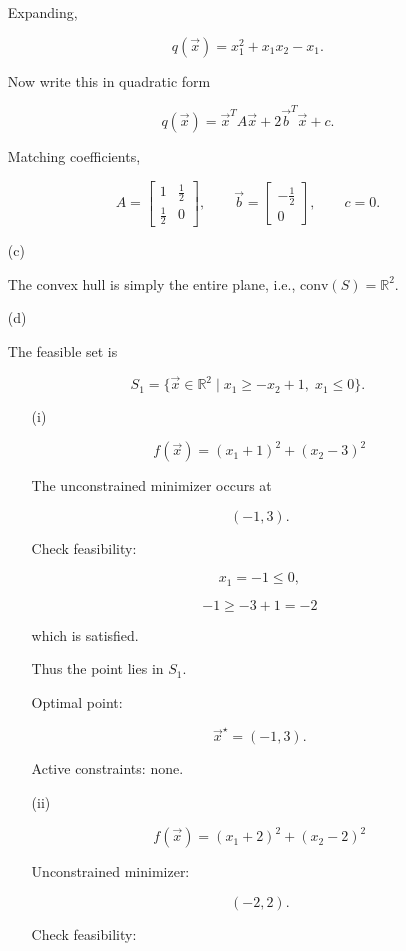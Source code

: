 \documentclass[
  12pt,
]{fphw}
\begin{document}
\begin{enumerate}
Expanding,

\[
q(\vec{x}) = x_1^2 + x_1x_2 - x_1.
\]

Now write this in quadratic form

\[
q(\vec{x}) = \vec{x}^T A \vec{x} + 2\vec{b}^T\vec{x} + c.
\]

Matching coefficients,

\[
A =
\begin{bmatrix}
1 & \tfrac12 \\
\tfrac12 & 0
\end{bmatrix},
\qquad
\vec{b} =
\begin{bmatrix}
-\tfrac12 \\
0
\end{bmatrix},
\qquad
c=0.
\]


\item[(c)]

The convex hull is simply the entire plane, i.e., $\text{conv}(S) = \mathbb{R}^2$.

\item[(d)]

The feasible set is

\[
S_1 =
\{\vec{x}\in\mathbb{R}^2 \mid x_1 \ge -x_2+1,\; x_1\le0\}.
\]

\begin{enumerate}

\item[(i)]

\[
f(\vec{x})=(x_1+1)^2+(x_2-3)^2
\]

The unconstrained minimizer occurs at

\[
(-1,3).
\]

Check feasibility:

\[
x_1=-1 \le0,
\]

\[
-1 \ge -3+1=-2
\]

which is satisfied.

Thus the point lies in $S_1$.

\medskip
Optimal point:

\[
\vec{x}^\star = (-1,3).
\]

Active constraints: none.

\bigskip

\item[(ii)]

\[
f(\vec{x})=(x_1+2)^2+(x_2-2)^2
\]

Unconstrained minimizer:

\[
(-2,2).
\]

Check feasibility:


\end{enumerate}
\end{enumerate}
\end{document}
